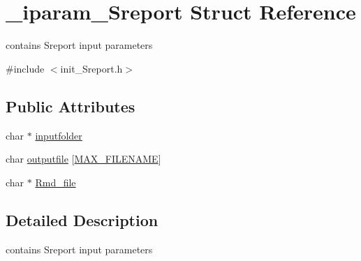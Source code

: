 \hypertarget{struct__iparam__Sreport}{\section{\+\_\+iparam\+\_\+\+Sreport Struct Reference}
\label{struct__iparam__Sreport}
}


contains Sreport input parameters  




{\ttfamily \#include $<$init\+\_\+\+Sreport.\+h$>$}

\subsection*{Public Attributes}
\begin{DoxyCompactItemize}
\item 
char $\ast$ \hyperlink{struct__iparam__Sreport_af5521a185f440566547b4b11b9fac6a4}{inputfolder}
\item 
char \hyperlink{struct__iparam__Sreport_aab71d9b5647daf65a8ba9ba6f7a35ee5}{outputfile} \mbox{[}\hyperlink{defines_8h_abe0ec333b60117063f9b9fd9f849cb08}{M\+A\+X\+\_\+\+F\+I\+L\+E\+N\+A\+M\+E}\mbox{]}
\item 
char $\ast$ \hyperlink{struct__iparam__Sreport_a8a234e0192ac0cb671c75ea16a545fa1}{Rmd\+\_\+file}
\end{DoxyCompactItemize}


\subsection{Detailed Description}
contains Sreport input parameters 

